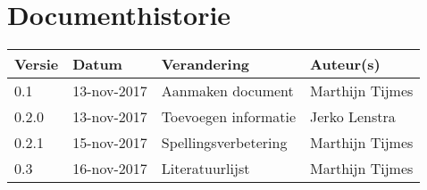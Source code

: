 \section{Documenthistorie}

\begin{tabularx}{\textwidth}{| l | l | X | l |}
	\hline
	\textbf{Versie} & \textbf{Datum} & \textbf{Verandering} & \textbf{Auteur(s)} \\ \hline
	0.1	& 13-nov-2017 & Aanmaken document & Marthijn Tijmes \\ \hline
    0.2.0 & 13-nov-2017 & Toevoegen informatie & Jerko Lenstra \\ \hline
    0.2.1 & 15-nov-2017 & Spellingsverbetering & Marthijn Tijmes \\ \hline
    0.3 & 16-nov-2017 & Literatuurlijst & Marthijn Tijmes \\ \hline

\end{tabularx}
